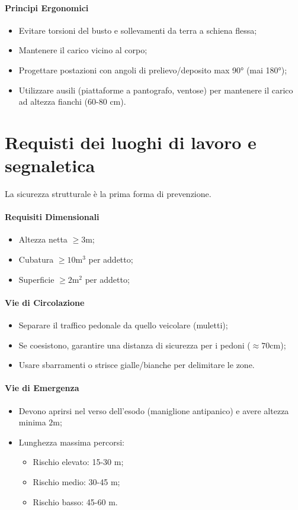 %
\paragraph{Principi Ergonomici}
\begin{itemize}
    \item Evitare torsioni del busto e sollevamenti da terra a schiena flessa;
    \item Mantenere il carico vicino al corpo;
    \item Progettare postazioni con angoli di prelievo/deposito max 90° (mai 180°);
    \item Utilizzare ausili (piattaforme a pantografo, ventose) per mantenere il carico ad altezza fianchi (60-80 cm).
\end{itemize}

%
\section{Requisti dei luoghi di lavoro e segnaletica}
La sicurezza strutturale è la prima forma di prevenzione.
%
\paragraph{Requisiti Dimensionali}
\begin{itemize}
    \item Altezza netta $\geq 3 \si{\m}$;
    \item Cubatura $\geq 10 \si{\m^3}$ per addetto;
    \item Superficie $\geq 2 \si{\m^2}$ per addetto;
\end{itemize}

%
\paragraph{Vie di Circolazione}
\begin{itemize}
    \item Separare il traffico pedonale da quello veicolare (muletti);
    \item Se coesistono, garantire una distanza di sicurezza per i pedoni ($\approx 70 \si{\cm} $);
    \item Usare sbarramenti o strisce gialle/bianche per delimitare le zone.
\end{itemize}

%
\paragraph{Vie di Emergenza}
\begin{itemize}
    \item Devono aprirsi nel verso dell'esodo (maniglione antipanico) e avere altezza minima $ 2 \si{\m} $;
    \item Lunghezza massima percorsi:
          \begin{itemize}
              \item Rischio elevato: 15-30 m;
              \item Rischio medio: 30-45 m;
              \item Rischio basso: 45-60 m.
          \end{itemize}
\end{itemize}

